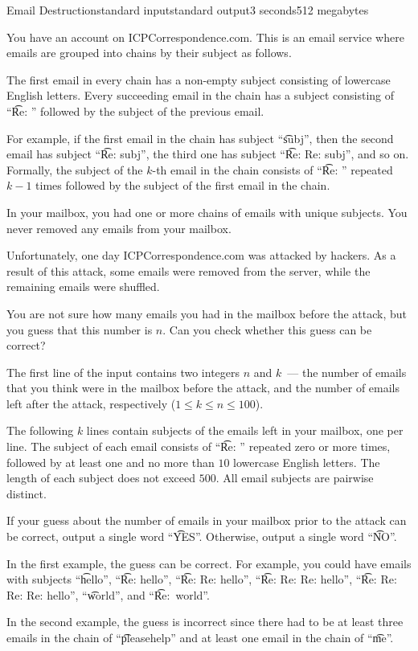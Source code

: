 \begin{problem}{Email Destruction}{standard input}{standard output}{3 seconds}{512 megabytes}

You have an account on ICPCorrespondence.com. This is an email service where emails are grouped into chains by their subject as follows.

The first email in every chain has a non-empty subject consisting of lowercase English letters. Every succeeding email in the chain has a subject consisting of ``\t{Re: }'' followed by the subject of the previous email.

For example, if the first email in the chain has subject ``\t{subj}'',
then the second email has subject ``\t{Re: subj}'', the third one has subject ``\t{Re: Re: subj}'', and so on. Formally, the subject of the $k$-th email in the chain consists of ``\t{Re: }'' repeated $k - 1$ times followed by the subject of the first email in the chain.

In your mailbox, you had one or more chains of emails with unique subjects. You never removed any emails from your mailbox.

Unfortunately, one day ICPCorrespondence.com was attacked by hackers. As a result of this attack, some emails were removed from the server, while the remaining emails were shuffled.

You are not sure how many emails you had in the mailbox before the attack, but you guess that this number is $n$. Can you check whether this guess can be correct?


\InputFile
The first line of the input contains two integers $n$ and $k$~--- the number of emails that you think were in the mailbox before the attack, and the number of emails left after the attack, respectively ($1 \leq k \leq n \leq 100$).

The following $k$ lines contain subjects of the emails left in your mailbox, one per line. The subject of each email consists of ``\t{Re: }'' repeated zero or more times, followed by at least one and no more than $10$ lowercase English letters. The length of each subject does not exceed $500$. All email subjects are pairwise distinct.

\OutputFile
If your guess about the number of emails in your mailbox prior to the attack can be correct, output a single word ``\t{YES}''. Otherwise, output a single word ``\t{NO}''.

\Examples

\begin{example}
%
%
\end{example}

\Note
In the first example, the guess can be correct. For example, you could have emails with subjects ``\t{hello}'', ``\t{Re: hello}'', ``\t{Re: Re: hello}'', ``\t{Re: Re: Re: hello}'', ``\t{Re: Re: Re: Re: hello}'', ``\t{world}'', and ``\t{Re:~world}''.

In the second example, the guess is incorrect since there had to be at least three emails in the chain of ``\t{pleasehelp}'' and at least one email in the chain of ``\t{me}''.

\end{problem}

